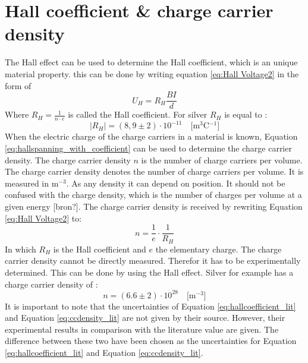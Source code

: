 \section{Hall coefficient \& charge carrier density}
The Hall effect can be used to determine the Hall coefficient, which is an unique material property. this can be done by writing equation \ref{eq:Hall Voltage2} in the form of
    \begin{equation}
        U_H = R_H \frac{B I}{d} \label{eq:hallspanning_with_coefficient}
    \end{equation}
Where $R_H=\frac{1}{n \cdot e}$ is called the Hall coefficient. For silver $R_H$ is equal to \cite{apparatus_silver}:
    \begin{equation}
        \mid R_H \mid = (8,9 \pm 2) \cdot 10^{-11}  \quad \text{[m$^3$C$^{-1}$]} \label{eq:hallcoefficient_lit}
    \end{equation}
When the electric charge of the charge carriers in a material is known, Equation \ref{eq:hallspanning_with_coefficient} can be used to determine the charge carrier density. The charge carrier density $n$ is the number of charge carriers per volume.  The charge carrier density denotes the number of charge carriers per volume. It is measured in m$^{-3}$. As any density it can depend on position. It should not be confused with the charge density, which is the number of charges per volume at a given energy [bron?]. The charge carrier density is received by rewriting Equation \ref{eq:Hall Voltage2} to:
    \begin{equation}
        n = \frac{1}{e} \cdot \frac{1}{R_H}
    \end{equation}
In which $R_H$ is the Hall coefficient and $e$ the elementary charge. The charge carrier density cannot be directly measured. Therefor it has to be experimentally determined. This can be done by using the Hall effect. Silver for example has a charge carrier density of \cite{apparatus_silver}:
    \begin{equation}
        n = (6.6 \pm 2)\cdot 10^{28} \quad \text{[m$^{-3}$]} \label{eq:ccdensity_lit}
    \end{equation}
It is important to note that the uncertainties of Equation \ref{eq:hallcoefficient_lit} and Equation \ref{eq:ccdensity_lit} are not given by their source. However, their experimental results in comparison with the literature value are given. The difference between these two have been chosen as the uncertainties for Equation \ref{eq:hallcoefficient_lit} and Equation \ref{eq:ccdensity_lit}.